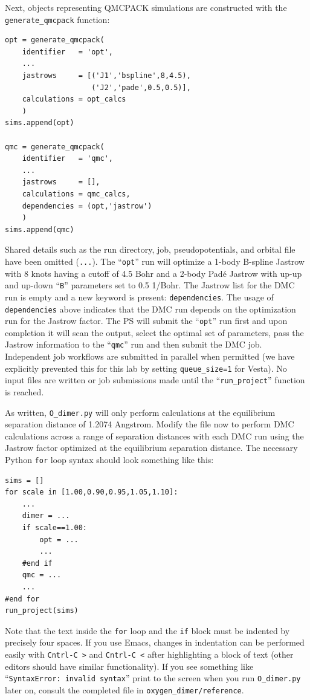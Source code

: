Next, objects representing QMCPACK simulations are constructed with the \texttt{generate\_qmcpack} function:
\begin{shaded}
\begin{verbatim}
opt = generate_qmcpack(
    identifier   = 'opt',
    ...
    jastrows     = [('J1','bspline',8,4.5), 
                    ('J2','pade',0.5,0.5)],
    calculations = opt_calcs
    )
sims.append(opt)

qmc = generate_qmcpack(
    identifier   = 'qmc',
    ...
    jastrows     = [],            
    calculations = qmc_calcs,
    dependencies = (opt,'jastrow') 
    )
sims.append(qmc)
\end{verbatim}
\end{shaded}
\noindent
Shared details such as the run directory, job, pseudopotentials, and orbital file have been omitted (\texttt{...}).  The ``\texttt{opt}'' run will optimize a 1-body B-spline Jastrow with 8 knots having a cutoff of 4.5 Bohr and a 2-body Pad\'{e} Jastrow with up-up and up-down ``\texttt{B}'' parameters set to 0.5 1/Bohr.  The Jastrow list for the DMC run is empty and a new keyword is present: \texttt{dependencies}.  The usage of \texttt{dependencies} above indicates that the DMC run depends on the optimization run for the Jastrow factor.  The PS will submit the ``\texttt{opt}'' run first and upon completion it will scan the output, select the optimal set of parameters, pass the Jastrow information to the ``\texttt{qmc}'' run and then submit the DMC job.  Independent job workflows are submitted in parallel when permitted (we have explicitly prevented this for this lab by setting \texttt{queue\_size=1} for Vesta).  No input files are written or job submissions made until the ``\texttt{run\_project}'' function is reached.

As written, \texttt{O\_dimer.py} will only perform calculations at the equilibrium separation distance of 1.2074 Angstrom.  Modify the file now to perform DMC calculations across a range of separation distances with each DMC run using the Jastrow factor optimized at the equilibrium separation distance.  The necessary Python \texttt{for} loop syntax should look something like this:
\begin{shaded}
\begin{verbatim}
sims = []
for scale in [1.00,0.90,0.95,1.05,1.10]:
    ...
    dimer = ...
    if scale==1.00:
        opt = ...
        ...
    #end if
    qmc = ...
    ...
#end for
run_project(sims)
\end{verbatim}
\end{shaded}
\noindent
Note that the text inside the \texttt{for} loop and the \texttt{if} block must be indented by precisely four spaces.  If you use Emacs, changes in indentation can be performed easily with \texttt{Cntrl-C >} and \texttt{Cntrl-C <} after highlighting a block of text (other editors should have similar functionality).  If you see something like  ``\texttt{SyntaxError: invalid syntax}'' print to the screen when you run \texttt{O\_dimer.py} later on, consult the completed file in \texttt{oxygen\_dimer/reference}.

